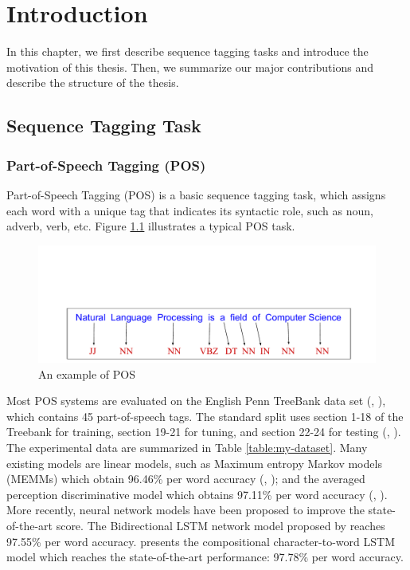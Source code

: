 \chapter{Introduction}

In this chapter, we first describe sequence tagging tasks and introduce the motivation of this thesis. Then, we summarize our major contributions and describe the structure of the thesis.

\section{Sequence Tagging Task}

\subsection{Part-of-Speech Tagging (POS)}
Part-of-Speech Tagging (POS) is a basic sequence tagging task, which assigns each word with a unique tag that indicates its syntactic role, such as noun, adverb, verb, etc. Figure \ref{fig:pos-ex} illustrates a typical POS task. 

\begin{figure}
  \centering
  \includegraphics[scale=0.6]{posex.pdf}
 \caption{An example of POS}
  \label{fig:pos-ex}
\end{figure}

Most POS systems are evaluated on the English Penn TreeBank data set (\citeauthor{marcus1993building}, \citeyear{marcus1993building}), which contains 45 part-of-speech tags. The standard split uses section 1-18 of the Treebank for training, section 19-21 for tuning, and section 22-24 for testing (\citeauthor{toutanova2003feature}, \citeyear{toutanova2003feature}). The experimental data are summarized in Table \ref{table:my-dataset}. Many existing models are linear models, such as Maximum entropy Markov models (MEMMs) which obtain 96.46\% per word accuracy (\citeauthor{mccallum2000maximum}, \citeyear{mccallum2000maximum}); and the averaged perception discriminative model which obtains 97.11\% per word accuracy (\citeauthor{collins2002discriminative}, \citeyear{collins2002discriminative}). More recently, neural network models have been proposed to improve the state-of-the-art score. The Bidirectional LSTM network model proposed by \cite{huang2015bidirectional} reaches 97.55\% per word accuracy. \cite{ling2015finding} presents the compositional character-to-word LSTM model which reaches the state-of-the-art performance: 97.78\% per word accuracy. 

